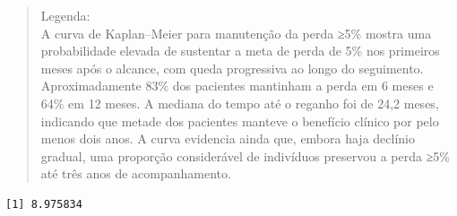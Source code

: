 \documentclass[
]{article}
\newenvironment{Shaded}{\begin{snugshade}}{\end{snugshade}}
\newcommand{\AttributeTok}[1]{\textcolor[rgb]{0.40,0.45,0.13}{#1}}
\newcommand{\CommentTok}[1]{\textcolor[rgb]{0.37,0.37,0.37}{#1}}
\newcommand{\ConstantTok}[1]{\textcolor[rgb]{0.56,0.35,0.01}{#1}}
\newcommand{\FunctionTok}[1]{\textcolor[rgb]{0.28,0.35,0.67}{#1}}
\newcommand{\NormalTok}[1]{\textcolor[rgb]{0.00,0.23,0.31}{#1}}
\newcommand{\OtherTok}[1]{\textcolor[rgb]{0.00,0.23,0.31}{#1}}
\newcommand{\SpecialCharTok}[1]{\textcolor[rgb]{0.37,0.37,0.37}{#1}}
\begin{document}
\begin{quote}
Legenda:\\
A curva de Kaplan--Meier para manutenção da perda ≥5\% mostra uma
probabilidade elevada de sustentar a meta de perda de 5\% nos primeiros
meses após o alcance, com queda progressiva ao longo do seguimento.
Aproximadamente 83\% dos pacientes mantinham a perda em 6 meses e 64\%
em 12 meses. A mediana do tempo até o reganho foi de 24,2 meses,
indicando que metade dos pacientes manteve o benefício clínico por pelo
menos dois anos. A curva evidencia ainda que, embora haja declínio
gradual, uma proporção considerável de indivíduos preservou a perda ≥5\%
até três anos de acompanhamento.\\
\end{quote}

\begin{Shaded}
\end{Shaded}

\begin{verbatim}
[1] 8.975834
\end{verbatim}
\end{document}
